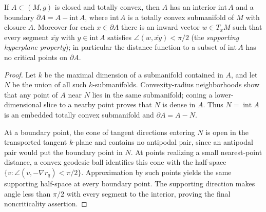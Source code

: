 \begin{lemma}
  \label{lem:pet-ch12-totally-convex-boundary-structure}
  If $A\subset(M,g)$ is closed and totally convex, then $A$ has an interior
  $\mathrm{int}\,A$ and a boundary $\partial A=A-\mathrm{int}\,A$, where
  $\mathrm{int}\,A$ is a totally convex submanifold of $M$ with closure $A$.
  Moreover for each $x\in\partial A$ there is an inward vector
  $w\in T_xM$ such that every segment $\overline{xy}$ with $y\in\mathrm{int}\,A$
  satisfies $\angle(w,\overline{xy})<\pi/2$ (the \emph{supporting hyperplane
  property}); in particular the distance function to a subset of
  $\mathrm{int}\,A$ has no critical points on $\partial A$.
\end{lemma}
\begin{proof}
  \sketch
  Let \(k\) be the maximal dimension of a submanifold contained in \(A\), and
  let \(N\) be the union of all such \(k\)-submanifolds. Convexity-radius
  neighborhoods show that any point of \(A\) near \(N\) lies in the same
  submanifold; coning a lower-dimensional slice to a nearby point proves that
  \(N\) is dense in \(A\). Thus \(N=\operatorname{int}A\) is an embedded totally
  convex submanifold and \(\partial A=A-N\).

  At a boundary point, the cone of tangent directions entering \(N\) is open in
  the transported tangent \(k\)-plane and contains no antipodal pair, since an
  antipodal pair would put the boundary point in \(N\). At points realizing a
  small nearest-point distance, a convex geodesic ball identifies this cone with
  the half-space \(\{v:\angle(v,-\nabla r_q)<\pi/2\}\). Approximation by such
  points yields the same supporting half-space at every boundary point. The
  supporting direction makes angle less than \(\pi/2\) with every segment to
  the interior, proving the final noncriticality assertion.
\end{proof}

